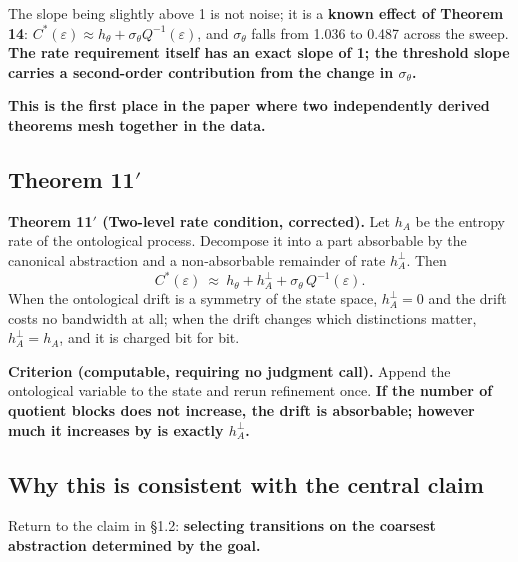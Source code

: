 \documentclass[11pt]{article}
\renewenvironment{quote}
  {\def\FrameCommand{{\color{gray!60}\vrule width 2pt}\hspace{8pt}}%
   \MakeFramed{\advance\hsize-\width \FrameRestore}\begin{itshape}}
  {\end{itshape}\endMakeFramed}
\begin{document}
The slope being slightly above 1 is not noise; it is a \textbf{known effect of Theorem 14}: \(C^*(\varepsilon)\approx h_\theta+\sigma_\theta Q^{-1}(\varepsilon)\), and \(\sigma_\theta\) falls from 1.036 to 0.487 across the sweep. \textbf{The rate requirement itself has an exact slope of 1; the threshold slope carries a second-order contribution from the change in \(\sigma_\theta\).}

\begin{quote}
\textbf{This is the first place in the paper where two independently derived theorems mesh together in the data.}
\end{quote}

\hypertarget{theorem-11}{%
\subsection{\texorpdfstring{Theorem 11\('\)}{Theorem 11'}}\label{theorem-11}}

\begin{quote}
\textbf{Theorem 11\('\) (Two-level rate condition, corrected).} Let \(h_A\) be the entropy rate of the ontological process. Decompose it into a part absorbable by the canonical abstraction and a non-absorbable remainder of rate \(h_A^{\perp}\). Then
\[\boxed{\ C^*(\varepsilon)\ \approx\ h_\theta+h_A^{\perp}+\sigma_\theta\,Q^{-1}(\varepsilon).\ }\]
When the ontological drift is a symmetry of the state space, \(h_A^\perp=0\) and the drift costs no bandwidth at all; when the drift changes which distinctions matter, \(h_A^\perp=h_A\), and it is charged bit for bit.
\end{quote}

\begin{quote}
\textbf{Criterion (computable, requiring no judgment call).} Append the ontological variable to the state and rerun refinement once. \textbf{If the number of quotient blocks does not increase, the drift is absorbable; however much it increases by is exactly \(h_A^\perp\).}
\end{quote}

\hypertarget{why-this-is-consistent-with-the-central-claim}{%
\subsection{Why this is consistent with the central claim}\label{why-this-is-consistent-with-the-central-claim}}

Return to the claim in \S{}1.2: \textbf{selecting transitions on the coarsest abstraction determined by the goal.}
\end{document}
